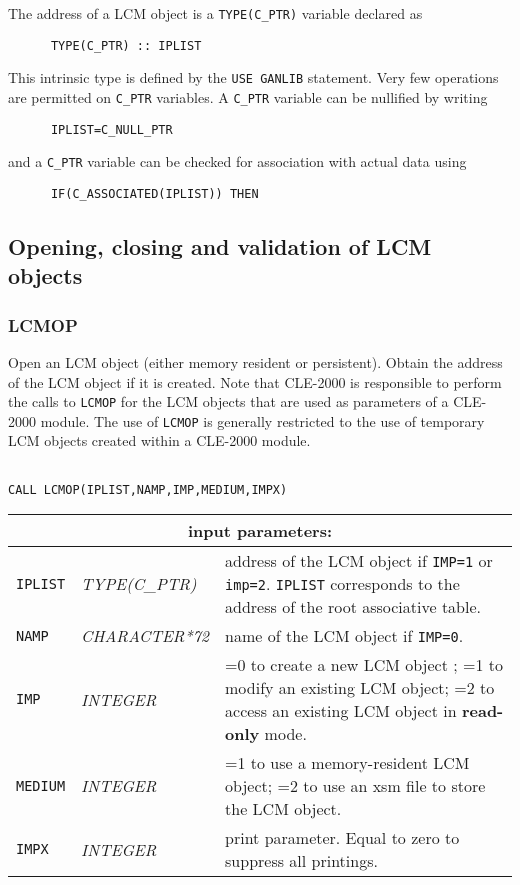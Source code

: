The address of a LCM object is a {\tt TYPE(C\_PTR)} variable declared as
\begin{verbatim}
      TYPE(C_PTR) :: IPLIST
\end{verbatim}
\noindent This intrinsic type is defined by the {\tt USE GANLIB} statement. Very few operations are permitted on
{\tt C\_PTR} variables. A {\tt C\_PTR} variable can be nullified by writing
\begin{verbatim}
      IPLIST=C_NULL_PTR
\end{verbatim}
\noindent and a {\tt C\_PTR} variable can be checked for association with actual data using
\begin{verbatim}
      IF(C_ASSOCIATED(IPLIST)) THEN
\end{verbatim}

\subsection{Opening, closing and validation of LCM objects}

\subsubsection{LCMOP}

Open an LCM object (either memory resident or persistent). Obtain the address of the LCM
object if it is created. Note that CLE-2000 is responsible to perform the calls to {\tt LCMOP} for the LCM
objects that are used as parameters of a CLE-2000 module. The use
of {\tt LCMOP} is generally restricted to the use of temporary LCM objects created within a CLE-2000 module.
\begin{verbatim}

CALL LCMOP(IPLIST,NAMP,IMP,MEDIUM,IMPX)
\end{verbatim}

\noindent
\begin{tabular}{|p{1.5cm}|p{3cm}|p{10cm}|}
\hline
\multicolumn{3}{|c|}{\bf input parameters:} \\
\hline
{\tt IPLIST} & {\it TYPE(C\_PTR)} & address of the LCM object if {\tt IMP=1} or {\tt imp=2}. {\tt IPLIST} corresponds to the address of the root associative table. \\
\hline
{\tt NAMP} & {\it CHARACTER*72} & name of the LCM object if  {\tt IMP=0}. \\
\hline
{\tt IMP} & {\it INTEGER} & =0 to create a new LCM object ; 
                                  =1 to modify an existing LCM object; 
				  =2 to access an existing LCM object in {\bf read-only} mode. \\
\hline
{\tt MEDIUM} & {\it INTEGER} & =1 to use a memory-resident LCM object; 
                                     =2 to use an {\sc xsm} file to store the LCM object. \\
\hline
{\tt IMPX} & {\it INTEGER} & print parameter. Equal to zero to suppress all printings. \\
\hline
\end{tabular}

